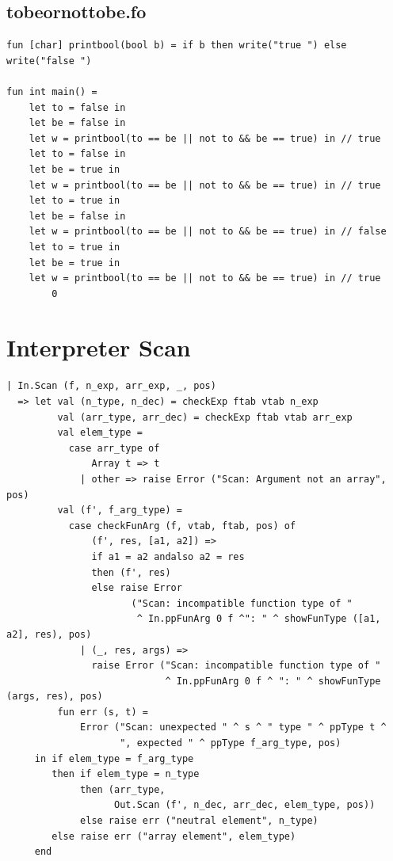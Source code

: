 \documentclass[11pt]{article}
\begin{document}
    \subsection{tobeornottobe.fo}
    \begin{lstlisting}[basicstyle=\small]
fun [char] printbool(bool b) = if b then write("true ") else write("false ")

fun int main() =
    let to = false in
    let be = false in
    let w = printbool(to == be || not to && be == true) in // true
    let to = false in
    let be = true in
    let w = printbool(to == be || not to && be == true) in // true
    let to = true in
    let be = false in
    let w = printbool(to == be || not to && be == true) in // false
    let to = true in
    let be = true in
    let w = printbool(to == be || not to && be == true) in // true
        0
    \end{lstlisting}

    \newpage
    \section{Interpreter Scan} \label{interpreter_scan}
    \begin{lstlisting}[basicstyle=\small]
| In.Scan (f, n_exp, arr_exp, _, pos)
  => let val (n_type, n_dec) = checkExp ftab vtab n_exp
         val (arr_type, arr_dec) = checkExp ftab vtab arr_exp
         val elem_type =
           case arr_type of
               Array t => t
             | other => raise Error ("Scan: Argument not an array", pos)
         val (f', f_arg_type) =
           case checkFunArg (f, vtab, ftab, pos) of
               (f', res, [a1, a2]) =>
               if a1 = a2 andalso a2 = res
               then (f', res)
               else raise Error
                      ("Scan: incompatible function type of "
                       ^ In.ppFunArg 0 f ^": " ^ showFunType ([a1, a2], res), pos)
             | (_, res, args) =>
               raise Error ("Scan: incompatible function type of "
                            ^ In.ppFunArg 0 f ^ ": " ^ showFunType (args, res), pos)
         fun err (s, t) =
             Error ("Scan: unexpected " ^ s ^ " type " ^ ppType t ^
                    ", expected " ^ ppType f_arg_type, pos)
     in if elem_type = f_arg_type
        then if elem_type = n_type
             then (arr_type,
                   Out.Scan (f', n_dec, arr_dec, elem_type, pos))
             else raise err ("neutral element", n_type)
        else raise err ("array element", elem_type)
     end
    \end{lstlisting}
\end{document}
